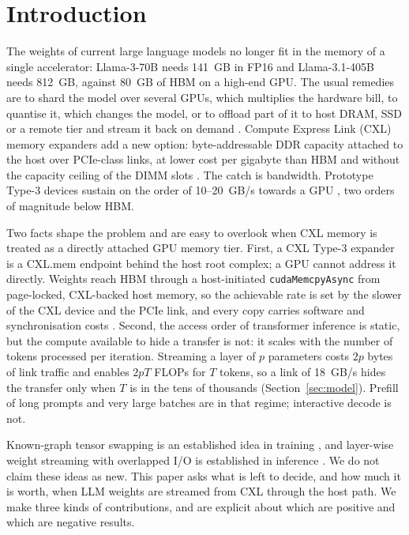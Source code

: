 \documentclass[preprint,12pt]{elsarticle}
\begin{document}
\section{Introduction}
\label{sec:intro}

The weights of current large language models no longer fit in the memory of a single accelerator: Llama-3-70B needs 141~GB in FP16 and Llama-3.1-405B needs 812~GB, against 80~GB of HBM on a high-end GPU. The usual remedies are to shard the model over several GPUs, which multiplies the hardware bill, to quantise it, which changes the model, or to offload part of it to host DRAM, SSD or a remote tier and stream it back on demand \cite{sheng2023flexgen,rajbhandari2021infinity,alizadeh2024flash}. Compute Express Link (CXL) memory expanders add a new option: byte-addressable DDR capacity attached to the host over PCIe-class links, at lower cost per gigabyte than HBM and without the capacity ceiling of the DIMM slots \cite{pond2023,tpp2023}. The catch is bandwidth. Prototype Type-3 devices sustain on the order of 10--20~GB/s towards a GPU \cite{yoon2025tract,jang2026itme}, two orders of magnitude below HBM.

Two facts shape the problem and are easy to overlook when CXL memory is treated as a directly attached GPU memory tier. First, a CXL Type-3 expander is a CXL.mem endpoint behind the host root complex; a GPU cannot address it directly. Weights reach HBM through a host-initiated \texttt{cudaMemcpyAsync} from page-locked, CXL-backed host memory, so the achievable rate is set by the slower of the CXL device and the PCIe link, and every copy carries software and synchronisation costs \cite{yoon2025tract}. Second, the access order of transformer inference is static, but the compute available to hide a transfer is not: it scales with the number of tokens processed per iteration. Streaming a layer of $p$ parameters costs $2p$ bytes of link traffic and enables $2pT$ FLOPs for $T$ tokens, so a link of 18~GB/s hides the transfer only when $T$ is in the tens of thousands (Section~\ref{sec:model}). Prefill of long prompts and very large batches are in that regime; interactive decode is not.

Known-graph tensor swapping is an established idea in training \cite{rhu2016vdnn,huang2020swapadvisor,hildebrand2020autotm,peng2020capuchin,ren2021sentinel}, and layer-wise weight streaming with overlapped I/O is established in inference \cite{sheng2023flexgen,jang2026itme}. We do not claim these ideas as new. This paper asks what is left to decide, and how much it is worth, when LLM weights are streamed from CXL through the host path. We make three kinds of contributions, and are explicit about which are positive and which are negative results.
\end{document}

